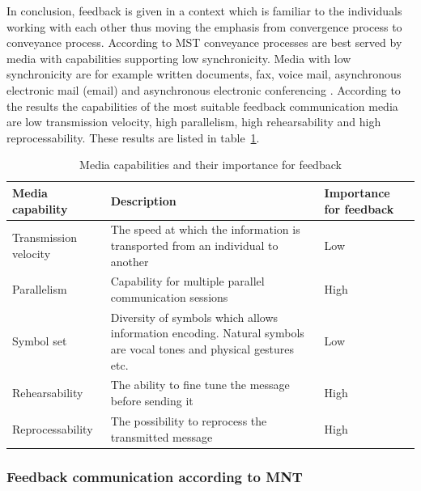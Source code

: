 \documentclass[english,12pt,a4paper,pdftex]{article}
\begin{document}
In conclusion, feedback is given in a context which is familiar to the individuals working with each other thus moving the emphasis from convergence process to conveyance process. According to MST conveyance processes are best served by media with capabilities supporting low synchronicity. Media with low synchronicity are for example written documents, fax, voice mail, asynchronous electronic mail (email) and asynchronous electronic conferencing \citep{dennis1999}. According to the results the capabilities of the most suitable feedback communication media are low transmission velocity, high parallelism, high rehearsability and high reprocessability. These results are listed in table~\ref{table:mst_feedback}.

\begin{table}[!h]
\renewcommand{\arraystretch}{1.3}
\caption{Media capabilities and their importance for feedback}
\label{table:mst_feedback}
\centering
\begin{tabular}{|p{4cm}|p{7cm}|p{3cm}|}
\hline
\textbf{Media capability} & \textbf{Description} & \textbf{Importance for feedback}\\
\hline
Transmission velocity & The speed at which the information is transported from an individual to another & Low \\
\hline
Parallelism & Capability for multiple parallel communication sessions & High \\
\hline
Symbol set & Diversity of symbols which allows information encoding. Natural symbols are vocal tones and physical gestures etc. & Low \\
\hline
Rehearsability & The ability to fine tune the message before sending it & High \\
\hline
Reprocessability & The possibility to reprocess the transmitted message & High \\
\hline
\end{tabular}
\end{table}

\subsubsection{Feedback communication according to MNT}
\end{document}
